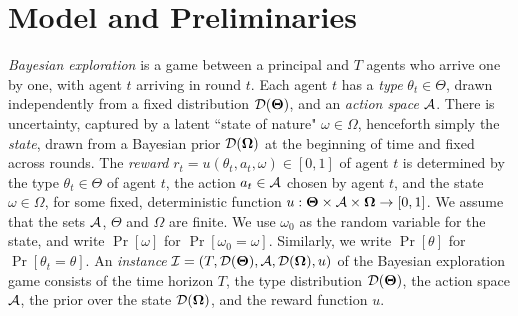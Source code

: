 \section{Model and Preliminaries}
\label{sec:model}

\emph{Bayesian exploration} is a game between a principal and $T$ agents who arrive one by one, with agent $t$ arriving in round $t$. Each agent $t$ has a {\em type} $\theta_t\in\varTheta$, drawn independently from a fixed distribution $\mathcal{D}(\bold{\Theta})$, and an {\em action space} $\mathcal{A}$.  There is uncertainty, captured by a latent ``state of nature" $\omega\in \varOmega$, henceforth simply the \emph{state}, drawn from a Bayesian prior $\mathcal{D}(\bold{\Omega})$ at the beginning of time and fixed across rounds. The {\em reward} $r_t = u(\theta_t,a_t,\omega)\in[0,1]$ of agent $t$ is determined by the type $\theta_t\in\varTheta$ of agent $t$, the action $a_t\in\mathcal{A}$ chosen by agent $t$, and the state $\omega\in\varOmega$, for some fixed, deterministic function
$u:\bold{\Theta}\times \mathcal{A} \times \bold{\Omega} \to [0,1]$.  We assume that the sets $\mathcal{A}$, $\varTheta$ and $\varOmega$ are finite. We use $\omega_0$ as the random variable for the state, and write $\Pr[\omega]$ for $\Pr[\omega_0=\omega]$. Similarly, we write $\Pr[\theta]$ for $\Pr[\theta_t=\theta]$. 
An {\em instance} $\mathcal{I}=(T,\mathcal{D}(\bold{\Theta}),\mathcal{A},\mathcal{D}(\bold{\Omega}),u)$ of the Bayesian exploration game consists of the time horizon $T$, the type distribution $\mathcal{D}(\bold{\Theta})$, the action space $\mathcal{A}$, the prior over the state $\mathcal{D}(\bold{\Omega})$, and the reward function $u$.


